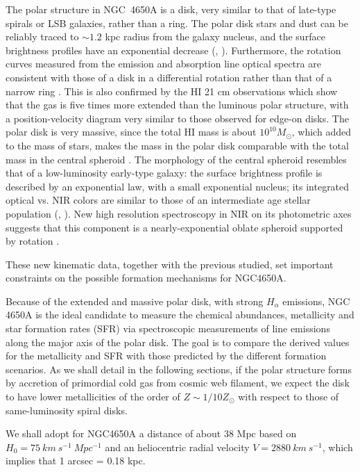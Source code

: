 \documentclass[12pt,preprint]{aastex}
\begin{document}
 The polar structure in NGC~4650A is a disk, very similar to that
   of late-type spirals or LSB galaxies, rather than a ring. The polar
   disk stars and dust can be reliably traced to $\sim 1.2$ kpc radius
   from the galaxy nucleus, and the surface brightness profiles have
   an exponential decrease (\citealt{Iod02},
   \citealt{Gal02}). Furthermore, the rotation curves measured from
 the emission and absorption line optical spectra are consistent with
 those of a disk in a differential rotation rather than that of a
 narrow ring \citep{Swa03}. This is also confirmed by the HI 21 cm
   observations \citep{Arn97} which show that the gas is five times
 more extended than the luminous polar structure, with a
 position-velocity diagram very similar to those observed for edge-on
 disks. The polar disk is very massive, since the total HI mass is
 about $10^{10} M_{\odot}$, which added to the mass of stars, makes
 the mass in the polar disk comparable with the total mass in the
 central spheroid \citep{Iod02}. The morphology of the central
   spheroid resembles that of a low-luminosity early-type galaxy: the
   surface brightness profile is described by an exponential law, with
   a small exponential nucleus; its integrated optical vs. NIR colors
   are similar to those of an intermediate age stellar population
   (\citealt{Iod02}, \citealt{Gal02}).  New high resolution
 spectroscopy in NIR on its photometric axes suggests that this
 component is a nearly-exponential oblate spheroid supported by
 rotation \citep{Iod06}.

These new kinematic data, together with the previous studied, set
  important constraints on the possible formation mechanisms for
  NGC4650A.

Because of the extended and massive polar disk, with strong $H_\alpha$
emissions, NGC 4650A is the ideal candidate to measure the chemical
abundances, metallicity and star formation rates (SFR) via
spectroscopic measurements of line emissions along the major axis of
the polar disk. The goal is to compare the derived values for the
metallicity and SFR with those predicted by the different formation
scenarios.  As we shall detail in the following sections, if the polar
structure forms by accretion of primordial cold gas from cosmic web
filament, we expect the disk to have lower metallicities of the order
of $Z\sim 1/10 Z_{\odot}$ \citep{Age09} with respect to those of
same-luminosity spiral disks.

We shall adopt for NGC4650A a distance of about 38 Mpc based on $H_{0}
= 75 \ km \ s^{-1} \ Mpc^{-1}$ and an heliocentric radial velocity $V
= 2880\ km \ s^{-1}$, which implies that 1 arcsec = 0.18 kpc.
\end{document}
